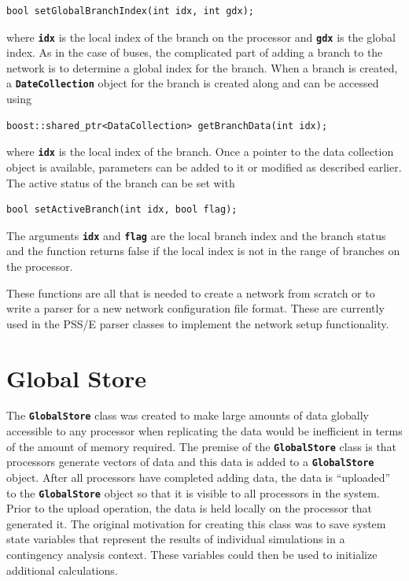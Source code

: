\documentclass[12pt]{report} %
\begin{document}
{
\color{red}
\begin{Verbatim}[fontseries=b]
bool setGlobalBranchIndex(int idx, int gdx);
\end{Verbatim}
}

where \texttt{\textbf{idx}} is the local index of the branch on the processor and \texttt{\textbf{gdx}} is the global index. As in the case of buses, the complicated part of adding a branch to the network is to determine a global index for the branch.
When a branch is created, a \texttt{\textbf{DateCollection}} object for the branch is created along and can be accessed using

{
\color{red}
\begin{Verbatim}[fontseries=b]
boost::shared_ptr<DataCollection> getBranchData(int idx);
\end{Verbatim}
}

where \texttt{\textbf{idx}} is the local index of the branch. Once a pointer to the data collection object is available, parameters can be added to it or modified as described earlier. The active status of the branch can be set with

{
\color{red}
\begin{Verbatim}[fontseries=b]
bool setActiveBranch(int idx, bool flag);
\end{Verbatim}
}

The arguments \texttt{\textbf{idx}} and \texttt{\textbf{flag}} are the local branch index and the branch status and the function returns false if the local index is not in the range of branches on the processor.

These functions are all that is needed to create a network from scratch or to write a parser for a new network configuration file format. These are currently used in the PSS/E parser classes to implement the network setup functionality.

\section{Global Store}

The \texttt{\textbf{GlobalStore}} class was created to make large amounts of data globally accessible to any processor when replicating the data would be inefficient in terms of the amount of memory required. The premise of the \texttt{\textbf{GlobalStore}} class is that processors generate vectors of data and this data is added to a \texttt{\textbf{GlobalStore}} object. After all processors have completed adding data, the data is ``uploaded'' to the \texttt{\textbf{GlobalStore}} object so that it is visible to all processors in the system. Prior to the upload operation, the data is held locally on the processor that generated it. The original motivation for creating this class was to save system state variables that represent the results of individual simulations in a contingency analysis context. These variables could then be used to initialize additional calculations.
\end{document}
